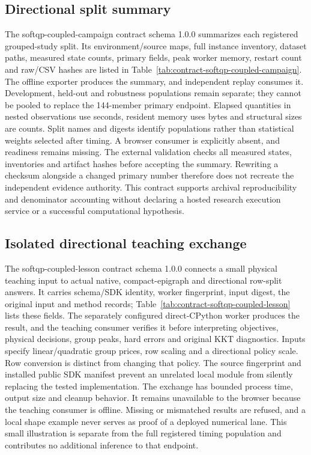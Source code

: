 \subsection{Directional split summary}\label{sec:contract-softqp-coupled-campaign} %
The softqp-coupled-campaign contract schema 1.0.0 summarizes each registered %
grouped-study split. Its environment/source maps, full instance inventory,
dataset paths, measured state counts, primary fields, peak worker memory,
restart count and raw/CSV hashes are listed in
Table~\ref{tab:contract-softqp-coupled-campaign}. The offline exporter produces %
the summary, and independent replay consumes it. Development, held-out and
robustness populations remain separate; they cannot be pooled to replace
the 144-member primary endpoint. Elapsed quantities in nested observations
use seconds, resident memory uses bytes and structural sizes are counts.
Split names and digests identify populations rather than statistical
weights selected after timing. A browser consumer is explicitly absent,
and readiness remains missing. The external validation checks all measured
states, inventories and artifact hashes before accepting the summary.
Rewriting a checksum alongside a changed primary number therefore does
not recreate the independent evidence authority. This contract supports
archival reproducibility and denominator accounting without declaring a
hosted research execution service or a successful computational hypothesis.

\subsection{Isolated directional teaching exchange}\label{sec:contract-softqp-coupled-lesson}
The softqp-coupled-lesson contract schema 1.0.0 connects a small physical
teaching input to actual native, compact-epigraph and directional row-split
answers. It carries schema/SDK identity, worker fingerprint, input digest,
the original input and method records; Table~\ref{tab:contract-softqp-coupled-lesson}
lists these fields. The separately configured direct-CPython worker produces
the result, and the teaching consumer verifies it before interpreting
objectives, physical decisions, group peaks, hard errors and original KKT
diagnostics. Inputs specify linear/quadratic group prices, row scaling
and a directional policy scale. Row conversion is distinct from changing
that policy. The source fingerprint and installed public SDK manifest
prevent an unrelated local module from silently replacing the tested
implementation. The exchange has bounded process time, output size and
cleanup behavior. It remains unavailable to the browser because the
teaching consumer is offline. Missing or mismatched results are refused,
and a local shape example never serves as proof of a deployed numerical
lane. This small illustration is separate from the full registered timing
population and contributes no additional inference to that endpoint.

